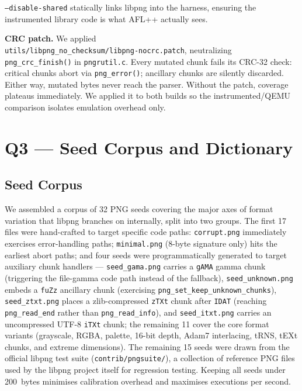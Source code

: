 \documentclass[letterpaper,twocolumn,10pt]{article}
\begin{document}
\texttt{--disable-shared} statically links libpng into the harness,
ensuring the instrumented library code is what AFL++ actually sees.

\textbf{CRC patch.} We applied
\\
\texttt{utils/libpng\_no\_checksum/libpng-nocrc.patch}, neutralizing
\texttt{png\_crc\_finish()} in \texttt{pngrutil.c}. Every mutated
chunk fails its CRC-32 check: critical chunks abort via
\texttt{png\_error()}; ancillary chunks are silently discarded.
Either way, mutated bytes never reach the parser. Without the patch,
coverage plateaus immediately. We applied it to both builds so the
instrumented/QEMU comparison isolates emulation overhead only.

\section{Q3 --- Seed Corpus and Dictionary}
\label{sec:q3}


\subsection{Seed Corpus}

We assembled a corpus of 32 PNG seeds covering the major axes of
format variation that libpng branches on internally, split into
two groups.
The first 17 files were hand-crafted to target specific code paths:
\texttt{corrupt.png} immediately exercises error-handling paths;
\texttt{minimal.png} (8-byte signature only) hits the earliest
abort paths; and four seeds were programmatically generated to
target auxiliary chunk handlers --- \texttt{seed\_gama.png}
carries a \texttt{gAMA} gamma chunk (triggering the file-gamma
code path instead of the fallback), \texttt{seed\_unknown.png}
embeds a \texttt{fuZz} ancillary chunk (exercising
\texttt{png\_set\_keep\_unknown\_chunks}), \texttt{seed\_ztxt.png}
places a zlib-compressed \texttt{zTXt} chunk after \texttt{IDAT}
(reaching \texttt{png\_read\_end} rather than
\texttt{png\_read\_info}), and \texttt{seed\_itxt.png} carries an
uncompressed UTF-8 \texttt{iTXt} chunk; the remaining 11 cover the
core format variants (grayscale, RGBA, palette, 16-bit depth,
Adam7 interlacing, tRNS, tEXt chunks, and extreme dimensions).
The remaining 15 seeds were drawn from the official libpng test
suite (\texttt{contrib/pngsuite/}), a collection of reference PNG
files used by the libpng project itself for regression testing.
Keeping all seeds under 200~bytes minimises calibration overhead
and maximises executions per second.
\end{document}
